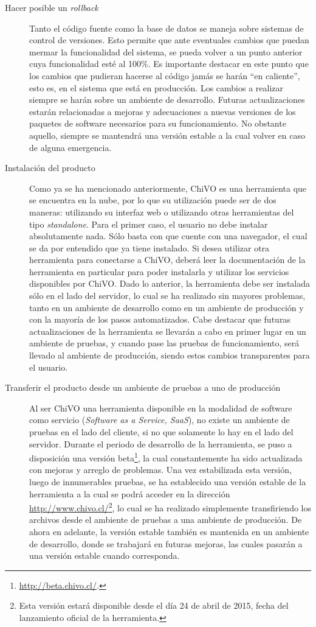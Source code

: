 \begin{description}
\begin{description}
			\item [Hacer posible un \emph{rollback}] Tanto el código fuente como la base de datos se maneja sobre sistemas de control de versiones. Esto permite que ante eventuales cambios que puedan mermar la funcionalidad del sistema, se pueda volver a un punto anterior cuya funcionalidad est\'e al 100\%. Es importante destacar en este punto que los cambios que pudieran hacerse al código jamás se harán ``en caliente'', esto es, en el sistema que está en producción. Los cambios a realizar siempre se harán sobre un ambiente de desarrollo. Futuras actualizaciones estarán relacionadas a mejoras y adecuaciones a nuevas versiones de los paquetes de software necesarios para su funcionamiento. No obstante aquello, siempre se mantendrá una versión estable a la cual volver en caso de alguna emergencia.
			\item [Instalación del producto] Como ya se ha mencionado anteriormente, ChiVO es una herramienta que se encuentra en la nube, por lo que su utilización puede ser de dos maneras: utilizando su interfaz web o utilizando otras herramientas del tipo \emph{standalone}. Para el primer caso, el usuario no debe instalar absolutamente nada. Sólo basta con que cuente con una navegador, el cual se da por entendido que ya tiene instalado. Si desea utilizar otra herramienta para conectarse a ChiVO, deberá leer la documentación de la herramienta en particular para poder instalarla y utilizar los servicios disponibles por ChiVO. Dado lo anterior, la herramienta debe ser instalada sólo en el lado del servidor, lo cual se ha realizado sin mayores problemas, tanto en un ambiente de desarrollo como en un ambiente de producción y con la mayoría de los pasos automatizados. Cabe destacar que futuras actualizaciones de la herramienta se llevarán a cabo en primer lugar en un ambiente de pruebas, y cuando pase las pruebas de funcionamiento, será llevado al ambiente de producción, siendo estos cambios transparentes para el usuario.
			\item [Transferir el producto desde un ambiente de pruebas a uno de producción] Al ser ChiVO una herramienta disponible en la modalidad de software como servicio (\emph{Software as a Service, SaaS}), no existe un ambiente de pruebas en el lado del cliente, si no que solamente lo hay en el lado del servidor. Durante el periodo de desarrollo de la herramienta, se puso a disposición una versión beta\footnote{\url{http://beta.chivo.cl/}.}, la cual constantemente ha sido actualizada con mejoras y arreglo de problemas. Una vez estabilizada esta versión, luego de innumerables pruebas, se ha establecido una versión estable de la herramienta a la cual se podrá acceder en la dirección \url{http://www.chivo.cl/}\footnote{Esta versión estará disponible desde el día 24 de abril de 2015, fecha del lanzamiento oficial de la herramienta.}, lo cual se ha realizado simplemente transfiriendo los archivos desde el ambiente de pruebas a una ambiente de producción. De ahora en adelante, la versión estable tambi\'en es mantenida en un ambiente de desarrollo, donde se trabajará en futuras mejoras, las cuales pasarán a una versión estable cuando corresponda.

\end{description}
\end{description}
